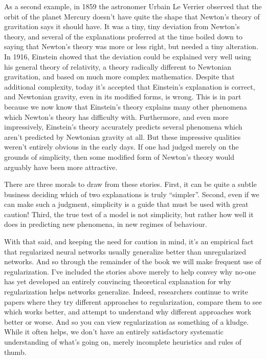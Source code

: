 \documentclass[a4paper,twoside,10pt]{book}
\begin{document}
As a second example, in 1859 the astronomer Urbain Le Verrier observed that the orbit of the planet Mercury doesn't have quite the shape that Newton's theory of gravitation says it should have. It was a tiny, tiny deviation from Newton's theory, and several of the explanations proferred at the time boiled down to saying that Newton's theory was more or less right, but needed a tiny alteration. In 1916, Einstein showed that the deviation could be explained very well using his general theory of relativity, a theory radically different to Newtonian gravitation, and based on much more complex mathematics. Despite that additional complexity, today it's accepted that Einstein's explanation is correct, and Newtonian gravity, even in its modified forms, is wrong. This is in part because we now know that Einstein's theory explains many other phenomena which Newton's theory has difficulty with. Furthermore, and even more impressively, Einstein's theory accurately predicts several phenomena which aren't predicted by Newtonian gravity at all. But these impressive qualities weren't entirely obvious in the early days. If one had judged merely on the grounds of simplicity, then some modified form of Newton's theory would arguably have been more attractive.

There are three morals to draw from these stories. First, it can be quite a subtle business deciding which of two explanations is truly ``simpler''. Second, even if we can make such a judgment, simplicity is a guide that must be used with great caution! Third, the true test of a model is not simplicity, but rather how well it does in predicting new phenomena, in new regimes of behaviour.

With that said, and keeping the need for caution in mind, it's an empirical fact that regularized neural networks usually generalize better than unregularized networks. And so through the remainder of the book we will make frequent use of regularization. I've included the stories above merely to help convey why no-one has yet developed an entirely convincing theoretical explanation for why regularization helps networks generalize. Indeed, researchers continue to write papers where they try different approaches to regularization, compare them to see which works better, and attempt to understand why different approaches work better or worse. And so you can view regularization as something of a kludge. While it often helps, we don't have an entirely satisfactory systematic understanding of what's going on, merely incomplete heuristics and rules of thumb.
\end{document}
